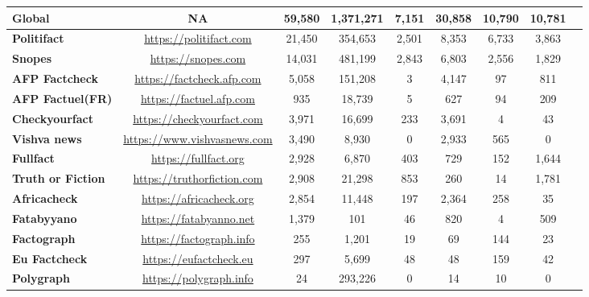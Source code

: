\documentclass[
]{ceurart}
\begin{document}
\begin{table}[t]
\begin{tabular}{|l|c|c|c|c|c|c|c|c|}
\textbf{Global}  & NA       & 59,580        & 1,371,271         & 7,151        & 30,858        & 10,790          & 10,781        \\ \hline
\textbf{Politifact }  &{\url{https://politifact.com}}    & 21,450        & 354,653          & 2,501        & 8,353         & 6,733           & 3,863         \\ \hline
\textbf{Snopes}  & {\url{https://snopes.com}}       & 14,031        & 481,199          & 2,843        & 6,803         & 2,556           & 1,829         \\ \hline
\textbf{AFP Factcheck} & {\url{https://factcheck.afp.com}}  & 5,058         & 151,208          & 3           & 4,147         & 97             & 811          \\ \hline
\textbf{AFP Factuel(FR)} &{\url{https://factuel.afp.com}}  & 935          & 18,739           & 5           & 627          & 94             & 209          \\ \hline
\textbf{Checkyourfact} & {\url{https://checkyourfact.com}}  & 3,971         & 16,699           & 233         & 3,691         & 4              & 43           \\ \hline
\textbf{Vishva news} &{\url{https://www.vishvasnews.com}}     & 3,490         & 8,930            & 0           & 2,933         & 565            & 0            \\ \hline
\textbf{Fullfact}  &{\url{https://fullfact.org} }      & 2,928         & 6,870            & 403         & 729          & 152            & 1,644         \\ \hline
\textbf{Truth or Fiction} &{\url{https://truthorfiction.com}} & 2,908         & 21,298           & 853         & 260          & 14             & 1,781         \\ \hline
\textbf{Africacheck}  &{\url{https://africacheck.org}}    & 2,854         & 11,448           & 197         & 2,364         & 258            & 35           \\ \hline
\textbf{Fatabyyano} &{\url{https://fatabyanno.net}}      & 1,379         & 101             & 46          & 820          & 4              & 509          \\ \hline
\textbf{Factograph} &{\url{https://factograph.info} }   & 255          & 1,201            & 19          & 69           & 144            & 23           \\ \hline
\textbf{Eu Factcheck} &{\url{https://eufactcheck.eu}}   & 297          & 5,699            & 48          & 48           & 159            & 42           \\ \hline
\textbf{Polygraph}  &{\url{https://polygraph.info}}    & 24           & 293,226          & 0           & 14           & 10             & 0            \\ \hline
\end{tabular}
\vspace{-2mm}
\end{table}
\end{document}
